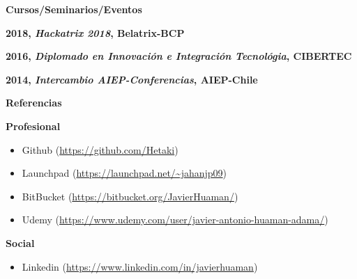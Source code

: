 \documentclass[a4paper,12pt,final]{memoir}
\newcommand{\Sep}{\vspace{1.5em}}
\newcommand{\SmallSep}{\vspace{0.5em}}
\newcommand{\CVSection}[1]
	{\Large\textbf{#1}\par
	\SmallSep\normalsize\normalfont}
\newcommand{\CVItem}[1]
	{\textbf{\color{RoyalBlue} #1}}
\begin{document}

\Sep %


\CVSection{Cursos/Seminarios/Eventos}


\CVItem{2018, \textit{Hackatrix 2018}, Belatrix-BCP}


\CVItem{2016, \textit{Diplomado en Innovación e Integración Tecnológia}, CIBERTEC}


\CVItem{2014, \textit{Intercambio AIEP-Conferencias}, AIEP-Chile}


\CVSection{Referencias}


\CVItem{Profesional}{
\begin{itemize}[noitemsep]
  \item Github (\url{https://github.com/Hetaki})
  \item Launchpad (\url{https://launchpad.net/~jahanjp09})
  \item BitBucket (\url{https://bitbucket.org/JavierHuaman/})
  \item Udemy (\url{https://www.udemy.com/user/javier-antonio-huaman-adama/})
\end{itemize}
}


\CVItem{Social}{
\begin{itemize}[noitemsep]
  \item Linkedin (\url{https://www.linkedin.com/in/javierhuaman})
\end{itemize}
}


\end{document}
